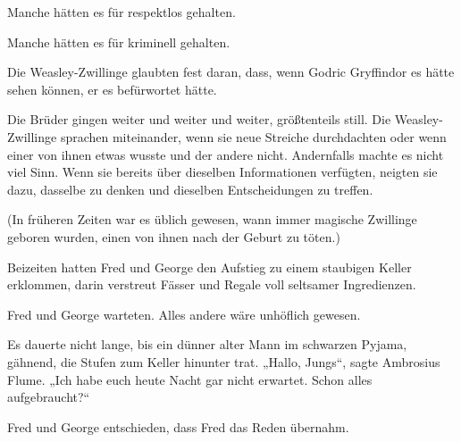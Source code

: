 Manche hätten es für respektlos gehalten.

Manche hätten es für kriminell gehalten.

Die Weasley-Zwillinge glaubten fest daran, dass, wenn Godric Gryffindor es hätte sehen können, er es befürwortet hätte.

Die Brüder gingen weiter und weiter und weiter, größtenteils still. Die Weasley-Zwillinge sprachen miteinander, wenn sie neue Streiche durchdachten oder wenn einer von ihnen etwas wusste und der andere nicht. Andernfalls machte es nicht viel Sinn. Wenn sie bereits über dieselben Informationen verfügten, neigten sie dazu, dasselbe zu denken und dieselben Entscheidungen zu treffen.

(In früheren Zeiten war es üblich gewesen, wann immer magische Zwillinge geboren wurden, einen von ihnen nach der Geburt zu töten.)

Beizeiten hatten Fred und George den Aufstieg zu einem staubigen Keller erklommen, darin verstreut Fässer und Regale voll seltsamer Ingredienzen.

Fred und George warteten. Alles andere wäre unhöflich gewesen.

Es dauerte nicht lange, bis ein dünner alter Mann im schwarzen Pyjama, gähnend, die Stufen zum Keller hinunter trat.
„Hallo, Jungs“, sagte Ambrosius Flume.
„Ich habe euch heute Nacht gar nicht erwartet. Schon alles aufgebraucht?“

Fred und George entschieden, dass Fred das Reden übernahm.


